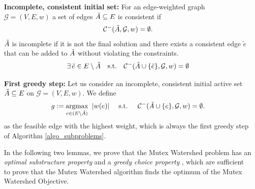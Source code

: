 \begin{definition}
\textbf{Incomplete, consistent initial set:}\label{def:initialset}
For an edge-weighted graph $\mathcal{G} = (V, E, w)$  a set of edges $\tilde{A} \subseteq E$ is consistent if
\begin{equation}
    \mathcal{C}^{-}(\tilde{A}, \mathcal{G}, w) = \emptyset.
\end{equation}
$\tilde{A}$ is incomplete if it is not the final solution and there exists a consistent edge $\tilde{e}$ that can be added to $\tilde{A}$ without violating the constraints.
    \begin{equation}
 \exists\, \tilde{e} \in E \setminus \tilde{A} \quad \textrm{s.t.} \quad  \mathcal{C}^{-}(\tilde{A} \cup \{\tilde{e}\}, \mathcal{G}, w) = \emptyset
\end{equation}
\end{definition}

\begin{definition}
\textbf{First greedy step:}\label{def:greedy_step}
Let us consider an incomplete, consistent initial active set $\tilde{A} \subseteq E$ on $\mathcal{G} = (V, E, w)$. We define 
\begin{equation}\label{eq:greedy_step}
       g := \underset{e \in (E \setminus \tilde{A})}{\text{argmax}} \;  \; |w(e)| \quad \textrm{ s.t. } \quad \mathcal{C}^{-}(\tilde{A} \cup \{e\}, \mathcal{G}, w)  =  \emptyset. 
\end{equation}
as the feasible edge with the highest weight, which is always the first greedy step of Algorithm \ref{algo_subproblems}.
\end{definition}
\noindent In the following two lemmas, %
 we prove that the Mutex Watershed problem has an \emph{optimal substructure property} and a \emph{greedy choice property} \cite{cormen2009introduction},
which are sufficient to prove that the Mutex Watershed algorithm finds the optimum of the Mutex Watershed Objective.


